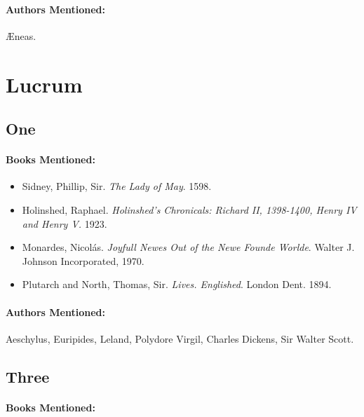 \documentclass[12pt]{article}
\providecommand{\tightlist}{%
  \setlength{\itemsep}{0pt}\setlength{\parskip}{0pt}}
\begin{document}
\paragraph{Authors Mentioned:}\label{authors-mentioned-5}

Æneas.

\section{Lucrum}\label{lucrum}

\subsection{One}\label{one-1}

\paragraph{Books Mentioned:}\label{books-mentioned-9}

\begin{itemize}
\tightlist
\item
  Sidney, Phillip, Sir. \emph{The Lady of May}. 1598.
\item
  Holinshed, Raphael. \emph{Holinshed's Chronicals: Richard II, 1398-1400, Henry IV and Henry V.} 1923.
\item
  Monardes, Nicolás. \emph{Joyfull Newes Out of the Newe Founde Worlde}. Walter J. Johnson Incorporated, 1970.
\item
  Plutarch and North, Thomas, Sir. \emph{Lives. Englished}. London Dent. 1894.
\end{itemize}

\paragraph{Authors Mentioned:}\label{authors-mentioned-6}

Aeschylus, Euripides, Leland, Polydore Virgil, Charles Dickens, Sir Walter Scott.

\subsection{Three}\label{three-1}

\paragraph{Books Mentioned:}\label{books-mentioned-10}
\end{document}
